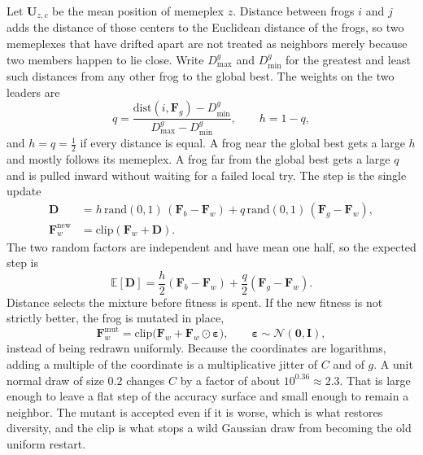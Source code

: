 \documentclass[11pt,a4paper]{article}
\newcommand{\vect}[1]{\mathbf{#1}}
\begin{document}
Let $\vect{U}_{z,c}$ be the mean position of memeplex $z$.
Distance between frogs $i$ and $j$ adds the distance of those centers to the Euclidean distance of the frogs, so two memeplexes that have drifted apart are not treated as neighbors merely because two members happen to lie close.
Write $D_{\max}^{g}$ and $D_{\min}^{g}$ for the greatest and least such distances from any other frog to the global best.
The weights on the two leaders are
\begin{equation}
q=\frac{\mathrm{dist}(i,\vect{F}_{g})-D_{\min}^{g}}{D_{\max}^{g}-D_{\min}^{g}},
\qquad h=1-q,
\label{eq:hq}
\end{equation}
and $h=q=\tfrac12$ if every distance is equal.
A frog near the global best gets a large $h$ and mostly follows its memeplex.
A frog far from the global best gets a large $q$ and is pulled inward without waiting for a failed local try.
The step is the single update
\begin{equation}
\begin{aligned}
\vect{D}
&=h\,\mathrm{rand}(0,1)\,(\vect{F}_{b}-\vect{F}_{w})
+q\,\mathrm{rand}(0,1)\,(\vect{F}_{g}-\vect{F}_{w}),\\
\vect{F}_{w}^{\mathrm{new}}
&=\mathrm{clip}(\vect{F}_{w}+\vect{D}).
\end{aligned}
\label{eq:leap}
\end{equation}
The two random factors are independent and have mean one half, so the expected step is
\begin{equation}
\mathbb{E}[\vect{D}]
=\frac{h}{2}(\vect{F}_{b}-\vect{F}_{w})+\frac{q}{2}(\vect{F}_{g}-\vect{F}_{w}).
\label{eq:mean}
\end{equation}
Distance selects the mixture before fitness is spent.
If the new fitness is not strictly better, the frog is mutated in place,
\begin{equation}
\vect{F}_{w}^{\mathrm{mut}}
=\mathrm{clip}\bigl(\vect{F}_{w}+\vect{F}_{w}\odot\boldsymbol{\varepsilon}\bigr),
\qquad \boldsymbol{\varepsilon}\sim\mathcal{N}(\vect{0},\vect{I}),
\label{eq:gauss}
\end{equation}
instead of being redrawn uniformly.
Because the coordinates are logarithms, adding a multiple of the coordinate is a multiplicative jitter of $C$ and of $g$.
A unit normal draw of size $0.2$ changes $C$ by a factor of about $10^{0.36}\approx 2.3$.
That is large enough to leave a flat step of the accuracy surface and small enough to remain a neighbor.
The mutant is accepted even if it is worse, which is what restores diversity, and the clip is what stops a wild Gaussian draw from becoming the old uniform restart.
\end{document}
